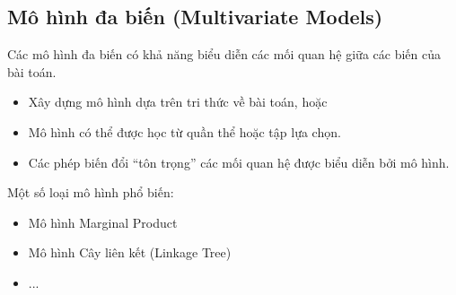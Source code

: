 \documentclass{book}
\begin{document}
        \subsection{Mô hình đa biến (Multivariate Models)}
        
        Các mô hình đa biến có khả năng biểu diễn các mối quan hệ giữa các biến của bài toán.
        \begin{itemize}
            \item Xây dựng mô hình dựa trên tri thức về bài toán, hoặc
            \item Mô hình có thể được học từ quần thể hoặc tập lựa chọn.
            \item Các phép biến đổi “tôn trọng” các mối quan hệ được biểu diễn bởi mô hình.
        \end{itemize}
        Một số loại mô hình phổ biến:
        \begin{itemize}
            \item Mô hình Marginal Product
            \item Mô hình Cây liên kết (Linkage Tree)
            \item ...
        \end{itemize}
\end{document}
